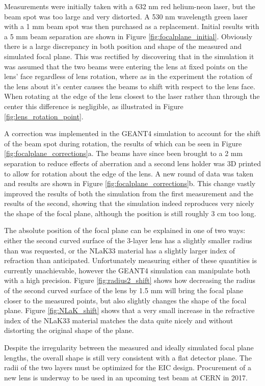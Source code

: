 Measurements were initially taken with a 632 nm red helium-neon laser, but the beam spot was too large and very distorted. A 530 nm wavelength green laser with a 1 mm beam spot was then purchased as a replacement. Initial results with a 5 mm beam separation are shown in Figure \ref{fig:focalplane_initial}. Obviously there is a large discrepancy in both position and shape of the measured and simulated focal plane. This was rectified by discovering that in the simulation it was assumed that the two beams were entering the lens at fixed points on the lens' face regardless of lens rotation, where as in the experiment the rotation of the lens about it's center causes the beams to shift with respect to the lens face. When rotating at the edge of the lens closest to the laser rather than through the center this difference is negligible, as illustrated in Figure \ref{fig:lens_rotation_point}.

A correction was implemented in the GEANT4 simulation to account for the shift of the beam spot during rotation, the results of which can be seen in Figure \ref{fig:focalplane_corrections}a. The beams have since been brought to a 2 mm separation to reduce effects of aberration and a second lens holder was 3D printed to allow for rotation about the edge of the lens. A new round of data was taken and results are shown in Figure \ref{fig:focalplane_corrections}b. This change vastly improved the results of both the simulation from the first measurement and the results of the second, showing that the simulation indeed reproduces very nicely the shape of the focal plane, although the position is still roughly 3 cm too long.

The absolute position of the focal plane can be explained in one of two ways: either the second curved surface of the 3-layer lens has a slightly smaller radius than was requested, or the NLaK33 material has a slightly larger index of refraction than anticipated. Unfortunately measuring either of these quantities is currently unachievable, however the GEANT4 simulation can manipulate both with a high precision. Figure \ref{fig:radius2_shift} shows how decreasing the radius of the second curved surface of the lens by 1.5 mm will bring the focal plane closer to the measured points, but also slightly changes the shape of the focal plane. Figure \ref{fig:NLaK_shift} shows that a very small increase in the refractive index of the NLaK33 material matches the data quite nicely and without distorting the original shape of the plane.

Despite the irregularity between the measured and ideally simulated focal plane lengths, the overall shape is still very consistent with a flat detector plane. The radii of the two layers must be optimized for the EIC design. Procurement of a new lens is underway to be used in an upcoming test beam at CERN in 2017.


